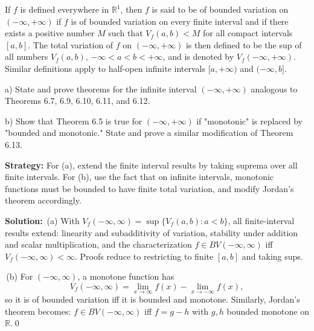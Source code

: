 \begin{problembox}
\begin{problemstatement}
If $f$ is defined everywhere in $\mathbb{R}^1$, then $f$ is said to be of bounded variation on $(-\infty, +\infty)$ if $f$ is of bounded variation on every finite interval and if there exists a positive number $M$ such that $V_f(a, b) < M$ for all compact intervals $[a, b]$. The total variation of $f$ on $(-\infty, +\infty)$ is then defined to be the sup of all numbers $V_f(a, b)$, $-\infty < a < b < +\infty$, and is denoted by $V_f(-\infty, +\infty)$. Similar definitions apply to half-open infinite intervals $[a, +\infty)$ and $(-\infty, b]$.

a) State and prove theorems for the infinite interval $(-\infty, +\infty)$ analogous to Theorems 6.7, 6.9, 6.10, 6.11, and 6.12.

b) Show that Theorem 6.5 is true for $(-\infty, +\infty)$ if "monotonic" is replaced by "bounded and monotonic." State and prove a similar modification of Theorem 6.13.
\end{problemstatement}
\end{problembox}

\noindent\textbf{Strategy:} For (a), extend the finite interval results by taking suprema over all finite intervals. For (b), use the fact that on infinite intervals, monotonic functions must be bounded to have finite total variation, and modify Jordan's theorem accordingly.

\bigskip\noindent\textbf{Solution:}
\,(a) With $V_f(-\infty,\infty)=\sup\{V_f(a,b): a<b\}$, all finite-interval results extend: linearity and subadditivity of variation, stability under addition and scalar multiplication, and the characterization $f\in BV(-\infty,\infty)$ iff $V_f(-\infty,\infty)<\infty$. Proofs reduce to restricting to finite $[a,b]$ and taking sups.

\,(b) For $(-\infty,\infty)$, a monotone function has
\[V_f(-\infty,\infty)=\lim_{x\to\infty}f(x)-\lim_{x\to-\infty}f(x),\]
so it is of bounded variation iff it is bounded and monotone. Similarly, Jordan’s theorem becomes: $f\in BV(-\infty,\infty)$ iff $f=g-h$ with $g,h$ bounded monotone on $\mathbb{R}$.\qed


